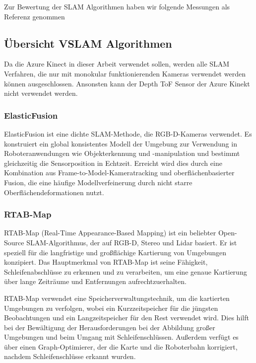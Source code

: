 Zur Bewertung der \ac{SLAM} Algorithmen haben wir folgende Messungen als Referenz genommen \cite{ragot:hal-04071273}

\subsection{Übersicht \ac{VSLAM} Algorithmen}

Da die Azure Kinect in dieser Arbeit verwendet sollen, werden alle \ac{SLAM} Verfahren, die nur mit monokular funktionierenden Kameras verwendet werden können ausgeschlossen.
Ansonsten kann der Depth \ac{ToF} Sensor der Azure Kinekt nicht verwendet werden.

\subsubsection{ElasticFusion}


ElasticFusion ist eine dichte SLAM-Methode, die RGB-D-Kameras verwendet. Es konstruiert ein global konsistentes Modell der Umgebung zur Verwendung in Roboteranwendungen wie Objekterkennung und -manipulation und bestimmt gleichzeitig die Sensorposition in Echtzeit. Erreicht wird dies durch eine Kombination aus Frame-to-Model-Kameratracking und oberflächenbasierter Fusion, die eine häufige Modellverfeinerung durch nicht starre Oberflächendeformationen nutzt.


\subsubsection{RTAB-Map}

RTAB-Map (Real-Time Appearance-Based Mapping) ist ein beliebter Open-Source SLAM-Algorithmus, der auf RGB-D, Stereo und Lidar basiert. Er ist speziell für die langfristige und großflächige Kartierung von Umgebungen konzipiert. Das Hauptmerkmal von RTAB-Map ist seine Fähigkeit, Schleifenabschlüsse zu erkennen und zu verarbeiten, um eine genaue Kartierung über lange Zeiträume und Entfernungen aufrechtzuerhalten.

RTAB-Map verwendet eine Speicherverwaltungstechnik, um die kartierten Umgebungen zu verfolgen, wobei ein Kurzzeitspeicher für die jüngsten Beobachtungen und ein Langzeitspeicher für den Rest verwendet wird. Dies hilft bei der Bewältigung der Herausforderungen bei der Abbildung großer Umgebungen und beim Umgang mit Schleifenschlüssen. Außerdem verfügt es über einen Graph-Optimierer, der die Karte und die Roboterbahn korrigiert, nachdem Schleifenschlüsse erkannt wurden.

